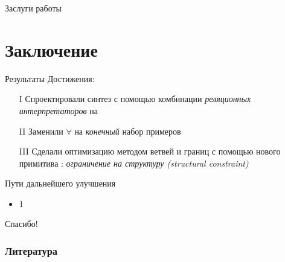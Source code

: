 \documentclass[aspectratio=169
  , xcolor={svgnames}
  , hyperref={ colorlinks,citecolor=Blue
             , linkcolor=DarkRed,urlcolor=DarkBlue}
  , russian
  ]{beamer}
\newcommand{\contributions}{
\begin{enumerate}
\item[I] Спроектировали синтез с помощью комбинации \emph{реляционных интерпретаторов} на \miniKanren{}
\item[II] Заменили $\forall$ на \emph{конечный} набор примеров
\item[III] Сделали оптимизацию методом ветвей и границ с помощью нового примитива \miniKanren{}: \emph{ограничение на структуру (structural constraint)}
\end{enumerate}
}
\begin{document}
\begin{frame}{Заслуги работы}
\Large
\end{frame}



\section{Заключение}

\begin{frame}{Результаты}
Достижения: \contributions
\vspace{1em}

\end{frame}


\begin{frame}{Пути дальнейшего улучшения}
\begin{itemize}
\item 1
\end{itemize}
\end{frame}

\begin{frame}
\begin{center}
{\Huge Спасибо!}
\end{center}
\end{frame}


\begin{frame}%
\frametitle{Литература}


\vspace{1cm}
\end{frame}
\end{document}
